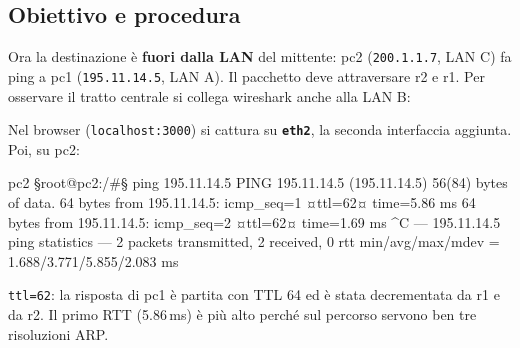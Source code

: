 
\subsection{Obiettivo e procedura}
Ora la destinazione è \textbf{fuori dalla LAN} del mittente: pc2 (\texttt{200.1.1.7}, LAN C) fa ping a pc1 (\texttt{195.11.14.5}, LAN A). Il pacchetto deve attraversare r2 e r1. Per osservare il tratto centrale si collega wireshark anche alla LAN B:
Nel browser (\texttt{localhost:3000}) si cattura su \textbf{\texttt{eth2}}, la seconda interfaccia aggiunta. Poi, su pc2:
\begin{terminale}{pc2}
§root@pc2:/#§ ping 195.11.14.5
PING 195.11.14.5 (195.11.14.5) 56(84) bytes of data.
64 bytes from 195.11.14.5: icmp_seq=1 ¤ttl=62¤ time=5.86 ms
64 bytes from 195.11.14.5: icmp_seq=2 ¤ttl=62¤ time=1.69 ms
^C
--- 195.11.14.5 ping statistics ---
2 packets transmitted, 2 received, 0%
rtt min/avg/max/mdev = 1.688/3.771/5.855/2.083 ms
\end{terminale}
\texttt{ttl=62}: la risposta di pc1 è partita con TTL 64 ed è stata decrementata da r1 e da r2. Il primo RTT (5.86\,ms) è più alto perché sul percorso servono ben tre risoluzioni ARP.

\begin{center}
\end{center}

